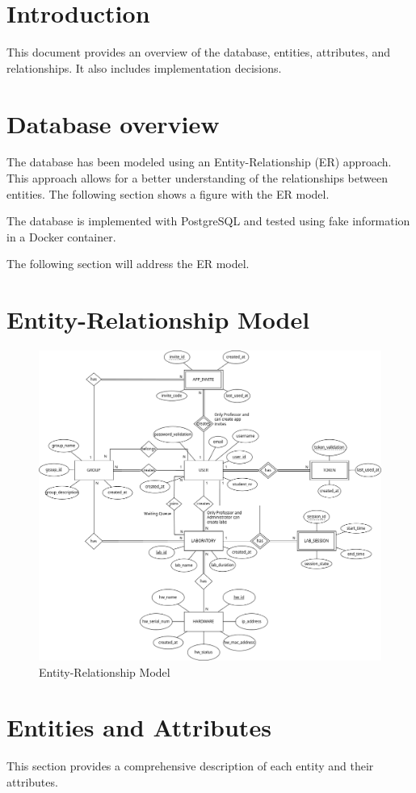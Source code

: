 \documentclass[a4paper,twoside,11pt]{article}
\begin{document}
\section*{Introduction}
This document provides an overview of the database, entities, attributes, and relationships. 
It also includes implementation decisions.

\section*{Database overview}
The database has been modeled using an Entity-Relationship (ER) approach.
This approach allows for a better understanding of the relationships between entities. The following section shows a figure with the ER model.

The database is implemented with PostgreSQL and tested using fake information in a Docker container.

The following section will address the ER model.
\section*{Entity-Relationship Model}
\begin{figure}[htbp]
	\centering
	\includegraphics[width=\textwidth]{../img/ERDiagramRL.drawio}
	\caption{Entity-Relationship Model}
	\label{fig:ERModel}
\end{figure}

\section*{Entities and Attributes}
This section provides a comprehensive description of each entity and their attributes.
\end{document}
